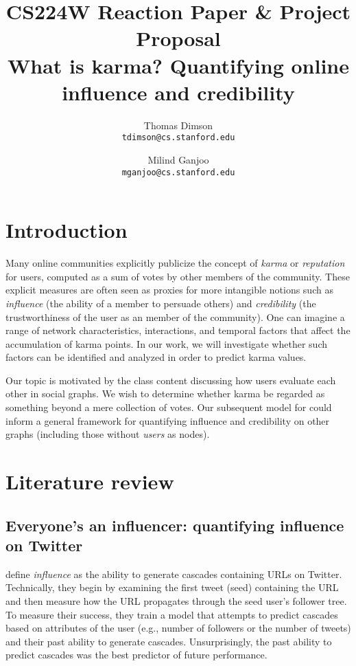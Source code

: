 \documentclass[10pt]{article}
\title{
  {\large CS224W Reaction Paper \& Project Proposal} \\
  What is karma? Quantifying online influence and credibility
}
\author{
  Thomas Dimson \\ {\tt tdimson@cs.stanford.edu}
  \and
  Milind Ganjoo \\ {\tt mganjoo@cs.stanford.edu}
}
\date{}
\begin{document}
\maketitle

\section{Introduction}

Many online communities explicitly publicize the concept of \textit{karma} or
\textit{reputation} for users, computed as a sum of votes by other members of
the community. These explicit measures are often seen as proxies for more
intangible notions such as \textit{influence} (the ability of a member to
persuade others) and \textit{credibility} (the trustworthiness of the user as an
member of the community). One can imagine a range of
network characteristics, interactions, and temporal factors that affect the
accumulation of karma points. In our work, we will investigate whether such
factors can be identified and analyzed in order to predict karma values.

Our topic is motivated by the class content discussing how users evaluate
each other in social graphs. We wish to determine whether karma be regarded
as something beyond a mere collection of votes. Our subsequent model for 
could inform a general framework for quantifying influence and credibility
on other graphs (including those without \textit{users} as nodes).

\section{Literature review}
\subsection{Everyone's an influencer: quantifying influence on Twitter \citep{bakshy2011everyone}}

\citet{bakshy2011everyone} define \textit{influence} as the ability to generate
cascades containing URLs on Twitter. Technically, they begin by examining the
first tweet (seed) containing the URL and then measure how the URL propagates
through the seed user's follower tree. To measure their success, they train a
model that attempts to predict cascades based on attributes of the user (e.g.,
number of followers or the number of tweets) and their past ability to generate
cascades.  Unsurprisingly, the past ability to predict cascades was the best
predictor of future performance.
\end{document}
